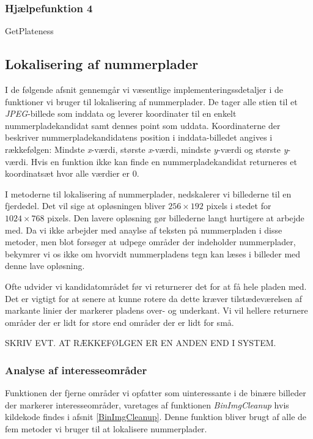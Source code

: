\subsubsection{Hjælpefunktion 4}
\label{sec:imp:GetPlateness}
GetPlateness

\subsection{Lokalisering af nummerplader}
I de følgende afsnit gennemgår vi væsentlige implementeringssdetaljer i de funktioner vi bruger til lokalisering af nummerplader. De tager alle stien til et \textit{JPEG}-billede som inddata og leverer koordinater til en enkelt nummerpladekandidat samt dennes point som uddata. Koordinaterne der beskriver nummerpladekandidatens position i inddata-billedet angives i rækkefølgen: Mindste \textit{x}-værdi, største \textit{x}-værdi, mindste \textit{y}-værdi og største \textit{y}-værdi. Hvis en funktion ikke kan finde en nummerpladekandidat returneres et koordinatsæt hvor alle værdier er $0$.

I metoderne til lokalisering af nummerplader, nedskalerer vi billederne til en fjerdedel. Det vil sige at opløsningen bliver $256 \times 192$ pixels i stedet for $1024 \times 768$ pixels. Den lavere opløsning gør billederne langt hurtigere at arbejde med. Da vi ikke arbejder med anaylse af teksten på nummerpladen i disse metoder, men blot forsøger at udpege områder der indeholder nummerplader, bekymrer vi os ikke om hvorvidt nummerpladens tegn kan læses i billeder med denne lave opløsning.

Ofte udvider vi kandidatområdet før vi returnerer det for at få hele pladen med. Det er vigtigt for at senere at kunne rotere da dette kræver tilstædeværelsen af markante linier der markerer pladens over- og underkant. Vi vil hellere returnere områder der er lidt for store end områder der er lidt for små.

SKRIV EVT. AT RÆKKEFØLGEN ER EN ANDEN END I SYSTEM.


\subsubsection{Analyse af interesseområder}
\label{sec:imp:BinImgCleanup}
Funktionen der fjerne områder vi opfatter som uinteressante i de binære billeder der markerer interesseområder, varetages af funktionen \textit{BinImgCleanup} hvis kildekode findes i afsnit \vref{BinImgCleanup}. Denne funktion bliver brugt af alle de fem metoder vi bruger til at lokalisere nummerplader.

